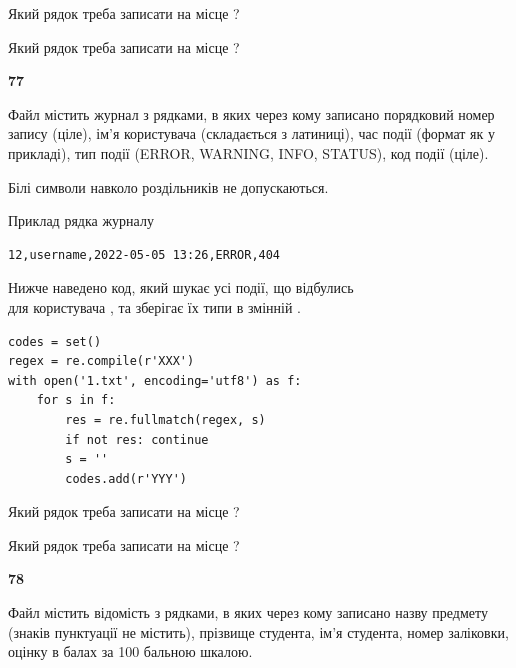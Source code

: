 Який рядок треба записати на місце  ?\par
\vspace{5mm}


Який рядок треба записати на місце  ?\par


\newpage

{\begin {center}\textbf{ 77}\end {center}}\par
Файл  містить журнал з рядками, в яких через кому записано поряд\-ко\-вий номер запису (ціле), ім'я користувача (складається з латиниці), час події (фор\-мат як у прикладі), тип події (ERROR, WARNING, INFO, STATUS), код події (ціле).

Білі символи навколо роздільників не допускаються.

Приклад рядка журналу



\begin{verbatim}
12,username,2022-05-05 13:26,ERROR,404
\end{verbatim}


Нижче наведено код, який шукає усі події, що відбулись\\ для користувача , та зберігає їх типи в змінній .



\begin{verbatim}
codes = set()
regex = re.compile(r'XXX')
with open('1.txt', encoding='utf8') as f:
    for s in f:
        res = re.fullmatch(regex, s)
        if not res: continue
        s = ''
        codes.add(r'YYY')
\end{verbatim}





Який рядок треба записати на місце  ?\par
\vspace{5mm}


Який рядок треба записати на місце  ?\par


\newpage

{\begin {center}\textbf{ 78}\end {center}}\par
Файл  містить відомість з рядками, в яких через кому записа\-но назву предмету (знаків пунктуації не містить), прізвище студента, ім'я студента, номер залі\-ков\-ки, оцінку в балах за 100 бальною шкалою.

